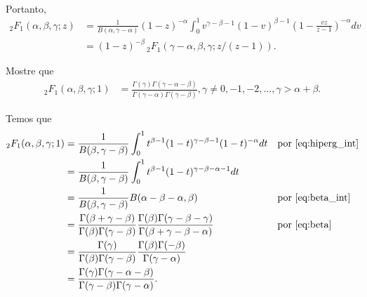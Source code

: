 \documentclass[a4paper,10pt, leqno, answers]{exam}  %
\begin{document}
\begin{questions}
\begin{parts}
\begin{solution}
\begin{align*}
            \end{align*}
            Portanto,
            \begin{align*}
                {}_2F_1(\alpha, \beta, \gamma; z) &= \frac{1}{B(\alpha, \gamma - \alpha)} (1 - z)^{-\alpha} \int_0^1 v^{\gamma - \beta - 1} (1 - v)^{\beta - 1} \left( 1 - \frac{vz}{z - 1} \right)^{-\alpha} dv \\
                &= (1 - z)^{-\beta} \,_2F_1(\gamma - \alpha, \beta, \gamma; z / (z - 1)).
            \end{align*}
        \end{solution}
    \end{parts}

     Mostre que
    \begin{align*}
        _2F_1(\alpha, \beta, \gamma; 1) &= \frac{\Gamma(\gamma)\Gamma(\gamma - \alpha - \beta)}{\Gamma(\gamma - \alpha) \Gamma(\gamma - \beta)}, \gamma \neq 0, -1, -2, \ldots, \gamma > \alpha + \beta.
    \end{align*}
    \begin{solution}
        Temos que
        \begin{align*}
            {}_2F_1(\alpha, \beta, \gamma; 1) &= \frac{1}{B(\beta, \gamma - \beta)} \int_0^1 t^{\beta - 1} (1 - t)^{\gamma - \beta - 1} (1 - t)^{-\alpha} dt && \text{por \eqref{eq:hiperg_int}} \\
            &= \frac{1}{B(\beta, \gamma - \beta)} \int_0^1 t^{\beta - 1} (1 - t)^{\gamma - \beta - \alpha - 1} dt \\
            &= \frac{1}{B(\beta, \gamma - \beta)} B(\alpha - \beta - \alpha, \beta) && \text{por \eqref{eq:beta_int}} \\
            &= \frac{\Gamma(\beta + \gamma - \beta)}{\Gamma(\beta) \Gamma(\gamma - \beta)} \frac{\Gamma(\beta) \Gamma(\gamma - \beta - \gamma)}{\Gamma(\beta + \gamma - \beta - \alpha)} && \text{por \eqref{eq:beta}} \\
            &= \frac{\Gamma(\gamma)}{\Gamma(\beta) \Gamma(\gamma - \beta)} \frac{\Gamma(\beta) \Gamma(- \beta)}{\Gamma(\gamma - \alpha)} \\
            &= \frac{\Gamma(\gamma) \Gamma(\gamma - \alpha - \beta)}{\Gamma(\gamma - \beta) \Gamma(\gamma - \alpha)}.
        \end{align*}
    \end{solution}


\end{questions}
\end{document}
